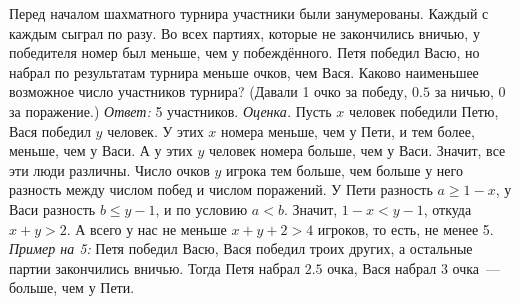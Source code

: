 \problem{}
Перед началом шахматного турнира участники были занумерованы.
Каждый с каждым сыграл по разу.
Во всех партиях, которые не закончились вничью, у победителя номер был меньше,
чем у побеждённого.
Петя победил Васю, но набрал по результатам турнира меньше очков, чем Вася.
Каково наименьшее возможное число участников турнира?
(Давали 1 очко за победу, $0.5$ за ничью, 0 за поражение.)
\solution
\emph{Ответ:} 5 участников.
\emph{Оценка.}
Пусть $x$ человек победили Петю, Вася победил $y$ человек.
У этих $x$ номера меньше, чем у Пети, и тем более, меньше, чем у Васи.
А у этих $y$ человек номера больше, чем у Васи.
Значит, все эти люди различны.
Число очков $y$ игрока тем больше, чем больше у него разность между числом
побед и числом поражений.
У Пети разность $a \geq 1 - x$, у Васи разность $b \leq y - 1$, и по условию
$a < b$.
Значит, $1 - x < y - 1$, откуда $x + y > 2$.
А всего у нас не меньше $x + y + 2 > 4$ игроков, то есть, не менее 5.
\emph{Пример на 5:} Петя победил Васю, Вася победил троих других, а остальные
партии закончились вничью.
Тогда Петя набрал $2.5$ очка, Вася набрал 3 очка~--- больше, чем у Пети.
\endproblem
